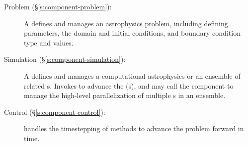 \begin{description}
%
 \item [\done Problem (\S\ref{s:component-problem}): ]
%
   A  defines and manages an astrophysics problem,
   including defining  parameters, the domain and
   initial conditions, and boundary condition type and values.
%
%
 \item [\done Simulation (\S\ref{s:component-simulation}): ]
%
   A  defines and manages a computational
   astrophysics  or an ensemble of related
   s. Invokes  to advance the
   (s), and may call the  component to
   manage the high-level parallelization of multiple s
   in an ensemble.
%
 \item [\todo Control (\S\ref{s:component-control}): ]
%
         handles the timestepping of methods to advance
        the problem forward in time.
\end{description}



















% 
% 
% 
% 
% 
% 
% 
% 
% 
% 
